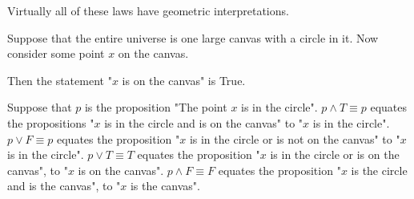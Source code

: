 Virtually all of these laws have geometric interpretations. 

Suppose that the entire universe is one large canvas with a circle in it. 
Now consider some point $x$ on the canvas.

Then the statement "$x$ is on the canvas" is True.

Suppose that $p$ is the proposition "The point $x$ is in the circle".
\newline
$p \land T \equiv p$ equates the propositions "$x$ is in the circle and is on the canvas" to "$x$ is in the circle".
\newline
$p \lor F\equiv p$ equates the proposition "$x$ is in the circle or is not on the canvas" to "$x$ is in the circle".
\newline
$p \lor T\equiv T$ equates the proposition "$x$ is in the circle or is on the canvas", to "$x$ is on the canvas".
\newline
$p \land F\equiv F$ equates the proposition "$x$ is  the circle and is  the  canvas", to "$x$ is   the canvas".

